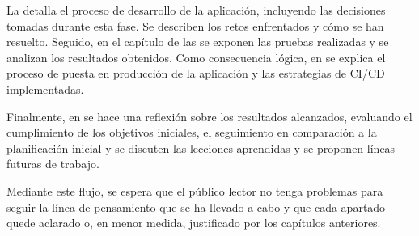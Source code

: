 La  detalla el proceso de desarrollo de la aplicación, incluyendo las decisiones tomadas durante esta fase. Se describen los retos enfrentados y cómo se han resuelto. Seguido, en el capítulo de las  se exponen las pruebas realizadas y se analizan los resultados obtenidos. Como consecuencia lógica, en  se explica el proceso de puesta en producción de la aplicación y las estrategias de CI/CD implementadas.

Finalmente, en  se hace una reflexión sobre los resultados alcanzados, evaluando el cumplimiento de los objetivos iniciales, el seguimiento en comparación a la planificación inicial y se discuten las lecciones aprendidas y se proponen líneas futuras de trabajo.

Mediante este flujo, se espera que el público lector no tenga problemas para seguir la línea de pensamiento que se ha llevado a cabo y que cada apartado quede aclarado o, en menor medida, justificado por los capítulos anteriores.

